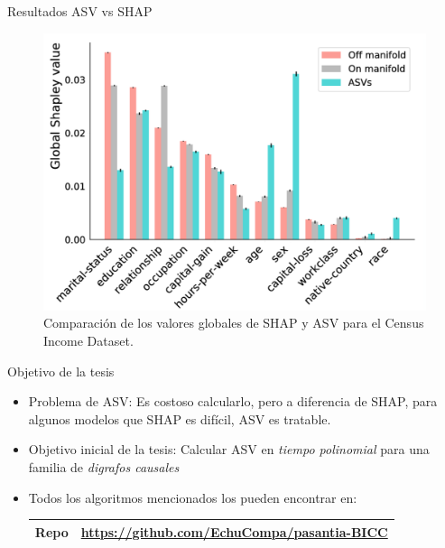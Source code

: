 \begin{frame}{Resultados ASV vs SHAP}
    \begin{figure}
        \centering
        \includegraphics[width=0.7\linewidth]{pic/img/asvPaperPlotExample.png}
        \caption*{Comparación de los valores globales de SHAP y ASV para el Census Income Dataset.}
    \end{figure}
\end{frame}

\begin{frame}{Objetivo de la tesis}
    \begin{itemize}[<+- | alert@+>]
        \item Problema de ASV: Es costoso calcularlo, pero a diferencia de SHAP, para algunos modelos que SHAP es difícil, ASV es tratable. 
        \item Objetivo inicial de la tesis: Calcular ASV en \emph{tiempo polinomial} para una familia de \textit{digrafos causales} %
        \item Todos los algoritmos mencionados los pueden encontrar en:
        \begin{table}
        \centering
        \begin{tabular}{ll}
            \toprule
            \textbf{Repo} & \url{https://github.com/EchuCompa/pasantia-BICC} \\
            \bottomrule
        \end{tabular}
        \end{table}
    \end{itemize}
\end{frame}
